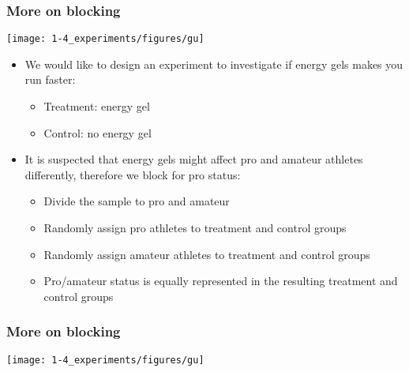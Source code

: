 \begin{frame}
\frametitle{More on blocking}


{
\begin{center}
\texttt{[image: 1-4\_experiments/figures/gu]}
\end{center}
}
{
\begin{itemize}
\item We would like to design an experiment to investigate if energy gels makes you run faster:

\pause

\begin{itemize}
\item Treatment: energy gel
\item Control: no energy gel
\end{itemize}

\pause

\item It is suspected that energy gels might affect pro and amateur athletes differently, therefore we block for pro status:

\pause

\begin{itemize}
\item Divide the sample to pro and amateur
\item Randomly assign pro athletes to treatment and control groups
\item Randomly assign amateur athletes to treatment and control groups
\item Pro/amateur status is equally represented in the resulting treatment and control groups
\end{itemize}
\end{itemize}
}

\end{frame}


\begin{frame}
\frametitle{More on blocking}


{
\begin{center}
\texttt{[image: 1-4\_experiments/figures/gu]}
\end{center}
}
{

}



\end{frame}


